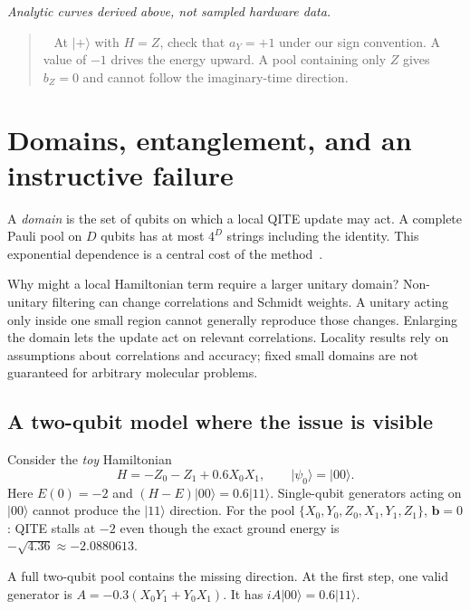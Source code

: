 \documentclass[11pt,a4paper]{article}
\newcommand{\ket}[1]{\lvert #1\rangle}
\newcommand{\lesson}[2]{\clearpage\section{#1}\label{#2}}
\newenvironment{idea}[1][Main idea]{\par\smallskip\begin{quotation}\noindent{\bfseries\textcolor{keyblue}{#1.}}\ }{\end{quotation}\smallskip}
\begin{document}
\begin{center}
\end{center}
\small\textit{Analytic curves derived above, not sampled hardware data.}\normalsize

\begin{idea}[Your first implementation test]
At $\ket{+}$ with $H=Z$, check that $a_Y=+1$ under our sign convention. A value of $-1$ drives the energy upward. A pool containing only $Z$ gives $b_Z=0$ and cannot follow the imaginary-time direction.
\end{idea}

\lesson{Domains, entanglement, and an instructive failure}{sec:domain}
A \emph{domain} is the set of qubits on which a local QITE update may act. A complete Pauli pool on $D$ qubits has at most $4^D$ strings including the identity. This exponential dependence is a central cost of the method~\cite{motta}.

Why might a local Hamiltonian term require a larger unitary domain? Non-unitary filtering can change correlations and Schmidt weights. A unitary acting only inside one small region cannot generally reproduce those changes. Enlarging the domain lets the update act on relevant correlations. Locality results rely on assumptions about correlations and accuracy; fixed small domains are not guaranteed for arbitrary molecular problems.

\subsection*{A two-qubit model where the issue is visible}
Consider the \emph{toy} Hamiltonian
\[
H=-Z_0-Z_1+0.6X_0X_1,\qquad \ket{\psi_0}=\ket{00}.
\]
Here $E(0)=-2$ and $(H-E)\ket{00}=0.6\ket{11}$. Single-qubit generators acting on $\ket{00}$ cannot produce the $\ket{11}$ direction. For the pool $\{X_0,Y_0,Z_0,X_1,Y_1,Z_1\}$, $\bm b=0$: QITE stalls at $-2$ even though the exact ground energy is $-\sqrt{4.36}\approx-2.0880613$.

A full two-qubit pool contains the missing direction. At the first step, one valid generator is $A=-0.3(X_0Y_1+Y_0X_1)$. It has $iA\ket{00}=0.6\ket{11}$.
\end{document}
